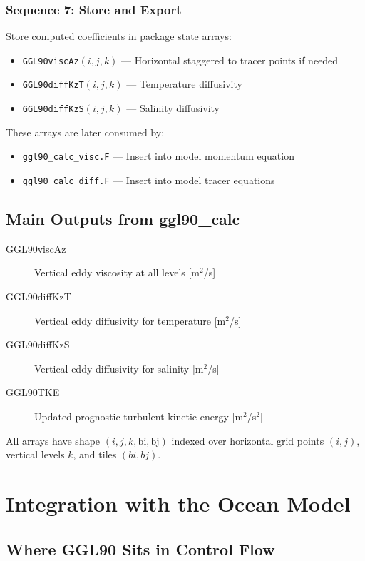 \documentclass[11pt, a4paper]{article}
\begin{document}
\subsubsection{Sequence 7: Store and Export}

Store computed coefficients in package state arrays:

\begin{itemize}
    \item \texttt{GGL90viscAz}$(i,j,k)$ — Horizontal staggered to tracer points if needed
    \item \texttt{GGL90diffKzT}$(i,j,k)$ — Temperature diffusivity
    \item \texttt{GGL90diffKzS}$(i,j,k)$ — Salinity diffusivity
\end{itemize}

These arrays are later consumed by:

\begin{itemize}
    \item \texttt{ggl90\_calc\_visc.F} — Insert into model momentum equation
    \item \texttt{ggl90\_calc\_diff.F} — Insert into model tracer equations
\end{itemize}

\subsection{Main Outputs from ggl90\_calc}

\begin{description}
    \item[GGL90viscAz] Vertical eddy viscosity at all levels [m$^2$/s]
    \item[GGL90diffKzT] Vertical eddy diffusivity for temperature [m$^2$/s]
    \item[GGL90diffKzS] Vertical eddy diffusivity for salinity [m$^2$/s]
    \item[GGL90TKE] Updated prognostic turbulent kinetic energy [m$^2$/s$^2$]
\end{description}

All arrays have shape $(i,j,k,\text{bi},\text{bj})$ indexed over horizontal grid points $(i,j)$, vertical levels $k$, and tiles $(bi,bj)$.

\section{Integration with the Ocean Model}

\subsection{Where GGL90 Sits in Control Flow}
\end{document}
